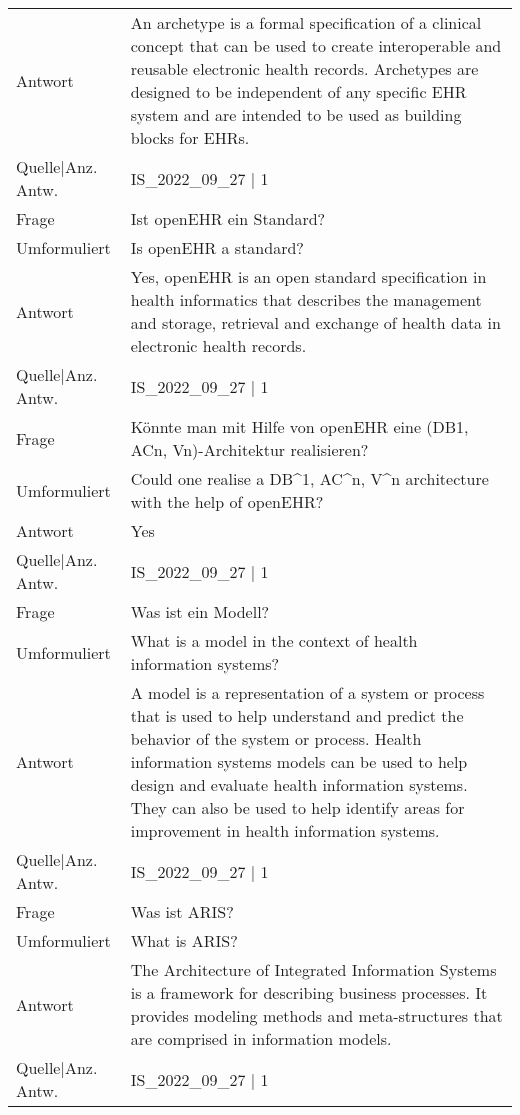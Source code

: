 {\begin{landscape}
\begin{longtable}{p{3cm}p{}}
    Antwort & An archetype is a formal specification of a clinical concept that can be used to create interoperable and reusable electronic health records.
    Archetypes are designed to be independent of any specific EHR system and are intended to be used as building blocks for EHRs.\\
    Quelle|Anz. Antw. & IS\_2022\_09\_27 | 1 \\
    \midrule
    Frage & Ist openEHR ein Standard? \\
    Umformuliert & Is openEHR a standard? \\
    Antwort & Yes, openEHR is an open standard specification in health informatics that describes the management and storage, retrieval and exchange of health data in electronic health records.\\
    Quelle|Anz. Antw. & IS\_2022\_09\_27 | 1 \\
    \midrule
    Frage & Könnte man mit Hilfe von openEHR eine (DB1, ACn, Vn)-Architektur realisieren? \\
    Umformuliert & Could one realise a DB\textasciicircum{}1, AC\textasciicircum{}n, V\textasciicircum{}n architecture with the help of openEHR? \\
    Antwort & Yes \\
    Quelle|Anz. Antw. & IS\_2022\_09\_27 | 1 \\
    \midrule
    Frage & Was ist ein Modell? \\
    Umformuliert & What is a model in the context of health information systems? \\
    Antwort & A model is a representation of a system or process that is used to help understand and predict the behavior of the system or process.
    Health information systems models can be used to help design and evaluate health information systems.
    They can also be used to help identify areas for improvement in health information systems.\\
    Quelle|Anz. Antw. & IS\_2022\_09\_27 | 1 \\
    \midrule
    Frage & Was ist ARIS? \\
    Umformuliert & What is ARIS? \\
    Antwort & The Architecture of Integrated Information Systems is a framework for describing business processes.
    It provides modeling methods and meta-structures that are comprised in information models.\\
    Quelle|Anz. Antw. & IS\_2022\_09\_27 | 1 \\
    \midrule

\end{longtable}
\end{landscape}}

